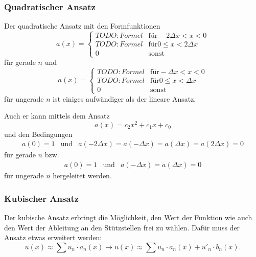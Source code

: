 \subsubsection{Quadratischer Ansatz}
Der quadratische Ansatz mit den Formfunktionen
\begin{equation}
    a(x) = \left\{ \begin{array}{ll}
        TODO: Formel & \text{für} -2 \Delta x < x < 0 \\
        TODO: Formel & \text{für} 0 \leq x < 2 \Delta x \\
        0            & \text{sonst}
    \end{array} \right.
\end{equation}
für gerade $n$ und
\begin{equation}
    a(x) = \left\{ \begin{array}{ll}
        TODO: Formel & \text{für} -\Delta x < x < 0 \\
        TODO: Formel & \text{für} 0 \leq x < \Delta x \\
        0            & \text{sonst}
    \end{array} \right.
\end{equation}
für ungerade $n$ ist einiges aufwändiger als der lineare Ansatz.

Auch er kann mittels dem Ansatz 
\begin{equation}
    a(x) = c_2x^2 + c_1x + c_0
\end{equation}
und den Bedingungen 
\begin{equation}
    \begin{array}{ccc}
        a(0) = 1 & \text{und} & a(-2 \Delta x) = a(-\Delta x) = a(\Delta x) = a(2 \Delta x) = 0
    \end{array}
\end{equation}
für gerade $n$ bzw.
\begin{equation}
    \begin{array}{ccc}
        a(0) = 1 & \text{und} & a(-\Delta x) = a(\Delta x) = 0
    \end{array}
\end{equation}
für ungerade $n$ hergeleitet werden.

\subsubsection{Kubischer Ansatz}
Der kubische Ansatz erbringt die Möglichkeit, den Wert der Funktion wie auch den Wert der Ableitung an den Stützstellen frei zu wählen.
Dafür muss der Ansatz etwas erweitert werden:
\begin{equation}
    u(x) \approx \sum{u_n \cdot a_n(x)} \rightarrow u(x) \approx \sum{u_n \cdot a_n(x) + u'_n \cdot b_n(x)}.
\end{equation}

